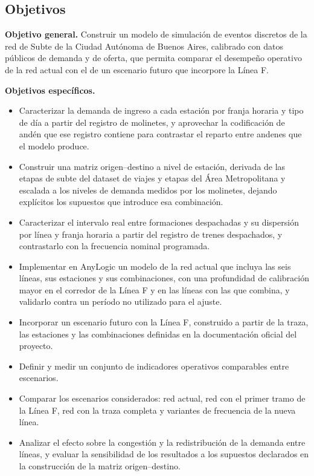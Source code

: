 \documentclass{article}
\begin{document}
\subsection{Objetivos}

\textbf{Objetivo general.} Construir un modelo de simulación de eventos discretos de la red de Subte de la
Ciudad Autónoma de Buenos Aires, calibrado con datos públicos de demanda y de oferta, que permita comparar
el desempeño operativo de la red actual con el de un escenario futuro que incorpore la Línea F.

\textbf{Objetivos específicos.}
\begin{itemize}
  \item Caracterizar la demanda de ingreso a cada estación por franja horaria y tipo de día a partir del
    registro de molinetes, y aprovechar la codificación de andén que ese registro contiene para
    contrastar el reparto entre andenes que el modelo produce.
  \item Construir una matriz origen--destino a nivel de estación, derivada de las etapas de subte del
    dataset de viajes y etapas del Área Metropolitana y escalada a los niveles de demanda medidos por
    los molinetes, dejando explícitos los supuestos que introduce esa combinación.
  \item Caracterizar el intervalo real entre formaciones despachadas y su dispersión por línea y franja
    horaria a partir del registro de trenes despachados, y contrastarlo con la frecuencia nominal
    programada.
  \item Implementar en AnyLogic un modelo de la red actual que incluya las seis líneas, sus estaciones y
    sus combinaciones, con una profundidad de calibración mayor en el corredor de la Línea F y en las
    líneas con las que combina, y validarlo contra un período no utilizado para el ajuste.
  \item Incorporar un escenario futuro con la Línea F, construido a partir de la traza, las estaciones y
    las combinaciones definidas en la documentación oficial del proyecto.
  \item Definir y medir un conjunto de indicadores operativos comparables entre escenarios.
  \item Comparar los escenarios considerados: red actual, red con el primer tramo de la Línea F, red con
    la traza completa y variantes de frecuencia de la nueva línea.
  \item Analizar el efecto sobre la congestión y la redistribución de la demanda entre líneas, y evaluar
    la sensibilidad de los resultados a los supuestos declarados en la construcción de la matriz
    origen--destino.
\end{itemize}
\end{document}
